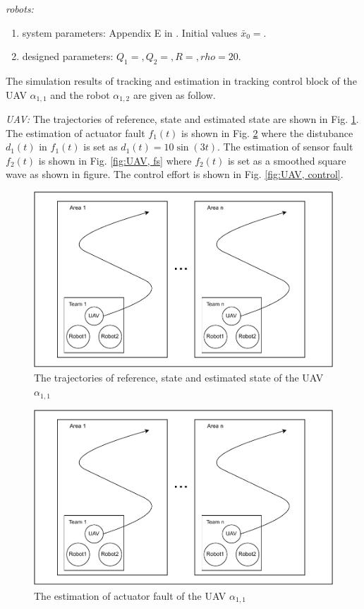 \documentclass{ieeeaccess}
\begin{document}
\textit{robots:} \begin{enumerate}
    \item system parameters: Appendix E in \cite{ourrobot}. Initial values $\bar{x}_0=$.
    \item designed parameters: $Q_1=,Q_2=,R=,rho=20$.
\end{enumerate}

The simulation results of tracking and estimation in tracking control block of the UAV $\alpha_{1,1}$ and the robot $\alpha_{1,2}$ are given as follow.

\textit{UAV:}
The trajectories of reference, state and estimated state are shown in Fig. \ref{fig:UAV, state}. The estimation of actuator fault $f_1(t)$ is shown in Fig. \ref{fig:UAV, fa} where the distubance $d_1(t)$ in $f_1(t)$ is set as $d_1(t)=10\sin(3t)$. The estimation of sensor fault $f_2(t)$ is shown in Fig. \ref{fig:UAV, fs} where $f_2(t)$ is set as a smoothed square wave as shown in figure. The control effort is shown in Fig. \ref{fig:UAV, control}.
\begin{figure}[htbp]
    \centering
    \includegraphics[scale=.42]{fig/1.pdf}\caption{The trajectories of reference, state and estimated state of the UAV $\alpha_{1,1}$}%
    \label{fig:UAV, state}
\end{figure}
\begin{figure}[htbp]
    \centering
    \includegraphics[scale=.42]{fig/1.pdf}\caption{The estimation of actuator fault of the UAV $\alpha_{1,1}$}
    \label{fig:UAV, fa}
\end{figure}
\end{document}
